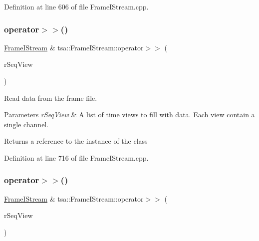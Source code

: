 Definition at line 606 of file Frame\+I\+Stream.\+cpp.

\mbox{\label{classtsa_1_1_frame_i_stream_ad2ad3c75a6448ce8ce8f119aee4609e5}} 
\subsubsection{\texorpdfstring{operator$>$$>$()}{operator>>()}\hspace{0.1cm}{\footnotesize\ttfamily [1/2]}}
{\footnotesize\ttfamily \hyperlink{classtsa_1_1_frame_i_stream}{Frame\+I\+Stream} \& tsa\+::\+Frame\+I\+Stream\+::operator$>$$>$ (\begin{DoxyParamCaption}\item[{std\+::vector$<$ \hyperlink{namespacetsa_ac599574bcc094eda25613724b8f3ca9e}{Seq\+View\+Double} $>$ \&}]{r\+Seq\+View }\end{DoxyParamCaption})}

Read data from the frame file.


\begin{DoxyParams}{Parameters}
{\em r\+Seq\+View} & A list of time views to fill with data. Each view contain a single channel.\\
\hline
\end{DoxyParams}
\begin{DoxyReturn}{Returns}
a reference to the instance of the class 
\end{DoxyReturn}


Definition at line 716 of file Frame\+I\+Stream.\+cpp.

\mbox{\label{classtsa_1_1_frame_i_stream_a1d57b62edf1783696b7c52120dad9e5a}} 
\subsubsection{\texorpdfstring{operator$>$$>$()}{operator>>()}\hspace{0.1cm}{\footnotesize\ttfamily [2/2]}}
{\footnotesize\ttfamily \hyperlink{classtsa_1_1_frame_i_stream}{Frame\+I\+Stream} \& tsa\+::\+Frame\+I\+Stream\+::operator$>$$>$ (\begin{DoxyParamCaption}\item[{\hyperlink{namespacetsa_ac599574bcc094eda25613724b8f3ca9e}{Seq\+View\+Double} \&}]{r\+Seq\+View }\end{DoxyParamCaption})}

